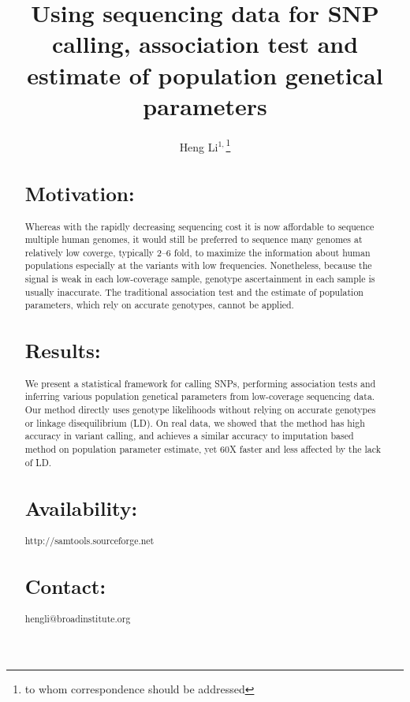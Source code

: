 \documentclass{bioinfo}
\begin{document}

\title[Inference using sequencing data]{Using sequencing data for SNP calling, association test and estimate of population genetical parameters}

\author[Li]{Heng Li$^{1,}$\footnote{to whom correspondence should be addressed}}

\address{$^1$Broad Institute, 7 Cambridge Center, Cambridge, MA 02142, USA}

\maketitle

\begin{abstract}
\section{Motivation:}
Whereas with the rapidly decreasing sequencing cost it is now affordable to sequence
multiple human genomes, it would still be preferred to sequence many genomes at
relatively low coverge, typically 2--6 fold, to maximize the information about
human populations especially at the variants with low frequencies. Nonetheless, because the signal is weak in each low-coverage sample,
genotype ascertainment in each sample is usually inaccurate. The traditional
association test and the estimate of population parameters, which rely on accurate genotypes,
cannot be applied.
\section{Results:}
We present a statistical framework for calling SNPs,
performing association tests and inferring various population genetical parameters from
low-coverage sequencing data. Our method directly uses genotype likelihoods without
relying on accurate genotypes or linkage disequilibrium (LD). On real data, we showed that
the method has high accuracy in variant calling, and achieves a similar accuracy to imputation
based method on population parameter estimate, yet 60X faster and less affected by the lack of LD.
\section{Availability:} http://samtools.sourceforge.net
\section{Contact:} hengli@broadinstitute.org
\end{abstract}
\end{document}

